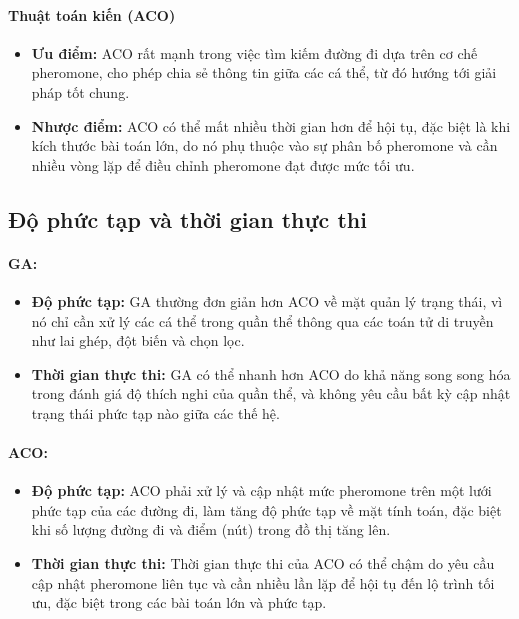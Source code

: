 \documentclass[14pt]{article}
\begin{document}
	\paragraph{Thuật toán kiến (ACO)}
	\begin{itemize}
	 	\item \textbf{Ưu điểm:} ACO rất mạnh trong việc tìm kiếm đường đi dựa trên cơ chế pheromone, cho phép chia sẻ thông tin giữa các cá thể, từ đó hướng tới giải pháp tốt chung.
	 	\item \textbf{Nhược điểm:} ACO có thể mất nhiều thời gian hơn để hội tụ, đặc biệt là khi kích thước bài toán lớn, do nó phụ thuộc vào sự phân bố pheromone và cần nhiều vòng lặp để điều chỉnh pheromone đạt được mức tối ưu.
	\end{itemize}
	
	\subsection{Độ phức tạp và thời gian thực thi}
	\paragraph{GA:}
	\begin{itemize}
		\item \textbf{Độ phức tạp:} GA thường đơn giản hơn ACO về mặt quản lý trạng thái, vì nó chỉ cần xử lý các cá thể trong quần thể thông qua các toán tử di truyền như lai ghép, đột biến và chọn lọc.
		\item \textbf{Thời gian thực thi:} GA có thể nhanh hơn ACO do khả năng song song hóa trong đánh giá độ thích nghi của quần thể, và không yêu cầu bất kỳ cập nhật trạng thái phức tạp nào giữa các thế hệ.
	\end{itemize}

	\paragraph{ACO:}
	\begin{itemize}
	 	\item \textbf{Độ phức tạp:} ACO phải xử lý và cập nhật mức pheromone trên một lưới phức tạp của các đường đi, làm tăng độ phức tạp về mặt tính toán, đặc biệt khi số lượng đường đi và điểm (nút) trong đồ thị tăng lên.
	 	\item \textbf{Thời gian thực thi:} Thời gian thực thi của ACO có thể chậm do yêu cầu cập nhật pheromone liên tục và cần nhiều lần lặp để hội tụ đến lộ trình tối ưu, đặc biệt trong các bài toán lớn và phức tạp.
	\end{itemize}
	
\end{document}
